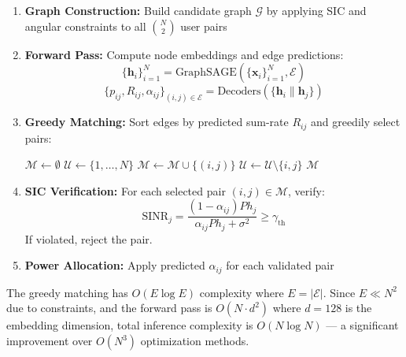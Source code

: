 \begin{enumerate}
    \item \textbf{Graph Construction:} Build candidate graph $\mathcal{G}$ by applying SIC and angular constraints to all $\binom{N}{2}$ user pairs
    
    \item \textbf{Forward Pass:} Compute node embeddings and edge predictions:
    \begin{equation}
    \{\mathbf{h}_i\}_{i=1}^N = \text{GraphSAGE}(\{\mathbf{x}_i\}_{i=1}^N, \mathcal{E})
    \end{equation}
    \begin{equation}
    \{p_{ij}, R_{ij}, \alpha_{ij}\}_{(i,j) \in \mathcal{E}} = \text{Decoders}(\{\mathbf{h}_i \| \mathbf{h}_j\})
    \end{equation}
    
    \item \textbf{Greedy Matching:} Sort edges by predicted sum-rate $R_{ij}$ and greedily select pairs:
    \begin{algorithmic}
        \State $\mathcal{M} \gets \emptyset$ 
        \State $\mathcal{U} \gets \{1, \ldots, N\}$ 
                \State $\mathcal{M} \gets \mathcal{M} \cup \{(i, j)\}$
                \State $\mathcal{U} \gets \mathcal{U} \setminus \{i, j\}$
            \EndIf
        \EndFor
        \State \Return $\mathcal{M}$
    \end{algorithmic}
    
    \item \textbf{SIC Verification:} For each selected pair $(i, j) \in \mathcal{M}$, verify:
    \begin{equation}
    \text{SINR}_j = \frac{(1-\alpha_{ij}) P h_j}{\alpha_{ij} P h_j + \sigma^2} \geq \gamma_{\text{th}}
    \end{equation}
    If violated, reject the pair.
    
    \item \textbf{Power Allocation:} Apply predicted $\alpha_{ij}$ for each validated pair
\end{enumerate}

The greedy matching has $O(E \log E)$ complexity where $E = |\mathcal{E}|$. Since $E \ll N^2$ due to constraints, and the forward pass is $O(N \cdot d^2)$ where $d=128$ is the embedding dimension, total inference complexity is $O(N \log N)$ — a significant improvement over $O(N^3)$ optimization methods.

